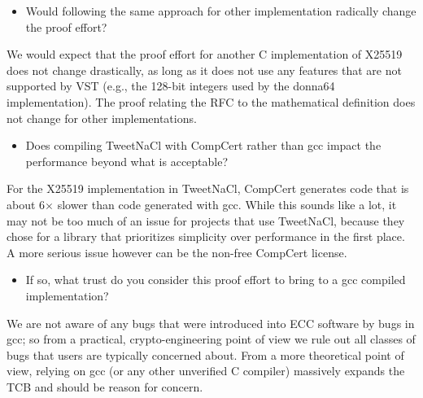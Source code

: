 \begin{itemize}
  \item Would following the same approach for other implementation radically change the proof effort?
\end{itemize}

\begin{answer}
  We would expect that the proof effort for another C implementation of X25519
  does not change drastically, as long as it does not use any features that are
  not supported by VST (e.g., the 128-bit integers used by the donna64
  implementation). The proof relating the RFC to the mathematical definition
  does not change for other implementations.
\end{answer}

\begin{itemize}
  \item Does compiling TweetNaCl with CompCert rather than gcc impact the performance beyond what is acceptable?
\end{itemize}

\begin{answer}
  For the X25519 implementation in TweetNaCl, CompCert generates code that is
  about 6$\times$ slower than code generated with gcc. While this sounds like a lot, it
  may not be too much of an issue for projects that use TweetNaCl, because they
  chose for a library that prioritizes simplicity over performance in the first
  place. A more serious issue however can be the non-free CompCert license.
\end{answer}

\begin{itemize}
  \item If so, what trust do you consider this proof effort to bring to a gcc compiled implementation?
\end{itemize}

\begin{answer}
  We are not aware of any bugs that were introduced into ECC software by bugs in
  gcc; so from a practical, crypto-engineering point of view we rule out all
  classes of bugs that users are typically concerned about. From a more
  theoretical point of view, relying on gcc (or any other unverified C compiler)
  massively expands the TCB and should be reason for concern.
\end{answer}
